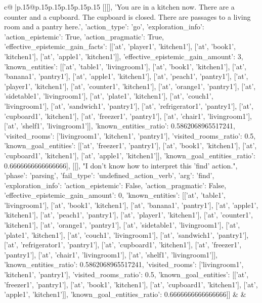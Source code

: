 \documentclass{article}
\begin{document}
{\begin{supertabular}{c@{$\;$}|p{.15\linewidth}@{}p{.15\linewidth}p{.15\linewidth}p{.15\linewidth}p{.15\linewidth}p{.15\linewidth}}
{{{	 [[[], 'You are in a kitchen now. There are a counter and a cupboard. The cupboard is closed. There are passages to a living room and a pantry here.', {'action_type': 'go', 'exploration_info': {'action_epistemic': True, 'action_pragmatic': True, 'effective_epistemic_gain_facts': [['at', 'player1', 'kitchen1'], ['at', 'book1', 'kitchen1'], ['at', 'apple1', 'kitchen1']], 'effective_epistemic_gain_amount': 3, 'known_entities': [['at', 'table1', 'livingroom1'], ['at', 'book1', 'kitchen1'], ['at', 'banana1', 'pantry1'], ['at', 'apple1', 'kitchen1'], ['at', 'peach1', 'pantry1'], ['at', 'player1', 'kitchen1'], ['at', 'counter1', 'kitchen1'], ['at', 'orange1', 'pantry1'], ['at', 'sidetable1', 'livingroom1'], ['at', 'plate1', 'kitchen1'], ['at', 'couch1', 'livingroom1'], ['at', 'sandwich1', 'pantry1'], ['at', 'refrigerator1', 'pantry1'], ['at', 'cupboard1', 'kitchen1'], ['at', 'freezer1', 'pantry1'], ['at', 'chair1', 'livingroom1'], ['at', 'shelf1', 'livingroom1']], 'known_entities_ratio': 0.5862068965517241, 'visited_rooms': ['livingroom1', 'kitchen1', 'pantry1'], 'visited_rooms_ratio': 0.5, 'known_goal_entities': [['at', 'freezer1', 'pantry1'], ['at', 'book1', 'kitchen1'], ['at', 'cupboard1', 'kitchen1'], ['at', 'apple1', 'kitchen1']], 'known_goal_entities_ratio': 0.6666666666666666}}], [[], "I don't know how to interpret this 'find' action.", {'phase': 'parsing', 'fail_type': 'undefined_action_verb', 'arg': 'find', 'exploration_info': {'action_epistemic': False, 'action_pragmatic': False, 'effective_epistemic_gain_amount': 0, 'known_entities': [['at', 'table1', 'livingroom1'], ['at', 'book1', 'kitchen1'], ['at', 'banana1', 'pantry1'], ['at', 'apple1', 'kitchen1'], ['at', 'peach1', 'pantry1'], ['at', 'player1', 'kitchen1'], ['at', 'counter1', 'kitchen1'], ['at', 'orange1', 'pantry1'], ['at', 'sidetable1', 'livingroom1'], ['at', 'plate1', 'kitchen1'], ['at', 'couch1', 'livingroom1'], ['at', 'sandwich1', 'pantry1'], ['at', 'refrigerator1', 'pantry1'], ['at', 'cupboard1', 'kitchen1'], ['at', 'freezer1', 'pantry1'], ['at', 'chair1', 'livingroom1'], ['at', 'shelf1', 'livingroom1']], 'known_entities_ratio': 0.5862068965517241, 'visited_rooms': ['livingroom1', 'kitchen1', 'pantry1'], 'visited_rooms_ratio': 0.5, 'known_goal_entities': [['at', 'freezer1', 'pantry1'], ['at', 'book1', 'kitchen1'], ['at', 'cupboard1', 'kitchen1'], ['at', 'apple1', 'kitchen1']], 'known_goal_entities_ratio': 0.6666666666666666}}]] 
	  } 
	   } 
	   } 
	 & & \\ 
 

    \theutterance {}  


\end{supertabular}}
\end{document}
